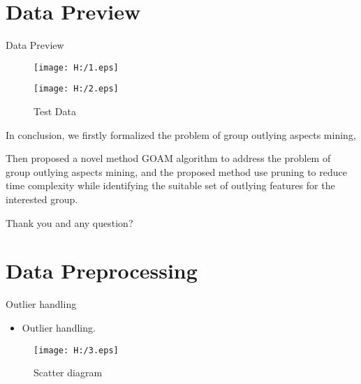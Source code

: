 \documentclass[
 size=14pt,
 paper=smartboard,  %
 mode=present, 		%
 display=slides, 	%
 style=tuliplab,  	%
 pauseslide,
 fleqn,leqno]{powerdot}
\begin{document}
\section{Data Preview}


\begin{slide}[toc=,bm=]{Data Preview}
  \begin{figure}
    \texttt{[image: H:/1.eps]}
    \caption{Train Data}
    \label{fig:1}
    \texttt{[image: H:/2.eps]}
    \caption{Test Data}
    \label{fig:2}
  \end{figure}

\begin{note}
In conclusion,
we firstly formalized the problem of
group outlying aspects mining,

Then proposed a novel method GOAM algorithm to address the problem of
group outlying aspects mining,
and the proposed method use pruning to reduce time complexity
while identifying the suitable set of outlying features for the interested group.

Thank you and any question?
\end{note}

\end{slide}




\section{Data Preprocessing}




\begin{slide}{Outlier handling}
\begin{itemize}
  \item
  Outlier handling.
\end{itemize}
  
\begin{figure}[t]
  \texttt{[image: H:/3.eps]}
  \caption{Scatter diagram}
  \label{fig:3}
\end{figure}

\end{slide}
\end{document}
